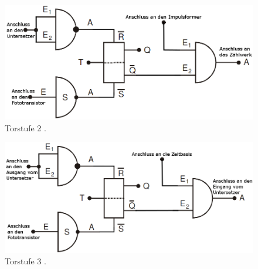 \begin{figure}
	\centering
	\includegraphics[width=\linewidth-50pt,height=\textheight-50pt,keepaspectratio]{content/Bilder/Torstufe2.png}
	\caption{Torstufe 2 \cite{V104}.}
	\label{fig:Aufbau}
\end{figure}
\begin{figure}
	\centering
	\includegraphics[width=\linewidth-50pt,height=\textheight-50pt,keepaspectratio]{content/Bilder/Torstufe3.png}
	\caption{Torstufe 3 \cite{V104}.}
	\label{fig:Aufbau}
\end{figure}

